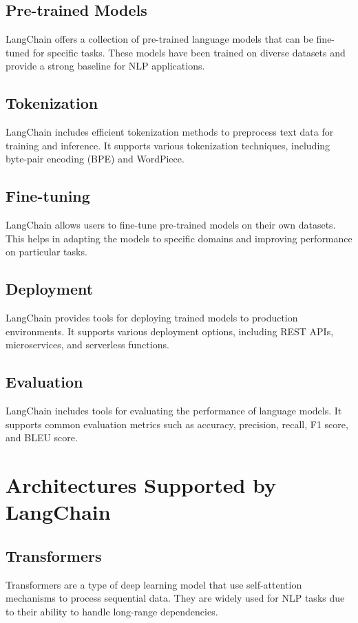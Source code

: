 \subsection{Pre-trained Models}
LangChain offers a collection of pre-trained language models that can be fine-tuned for specific tasks. These models have been trained on diverse datasets and provide a strong baseline for NLP applications.

\subsection{Tokenization}
LangChain includes efficient tokenization methods to preprocess text data for training and inference. It supports various tokenization techniques, including byte-pair encoding (BPE) and WordPiece.

\subsection{Fine-tuning}
LangChain allows users to fine-tune pre-trained models on their own datasets. This helps in adapting the models to specific domains and improving performance on particular tasks.

\subsection{Deployment}
LangChain provides tools for deploying trained models to production environments. It supports various deployment options, including REST APIs, microservices, and serverless functions.

\subsection{Evaluation}
LangChain includes tools for evaluating the performance of language models. It supports common evaluation metrics such as accuracy, precision, recall, F1 score, and BLEU score.

\section{Architectures Supported by LangChain}

\subsection{Transformers}
Transformers are a type of deep learning model that use self-attention mechanisms to process sequential data. They are widely used for NLP tasks due to their ability to handle long-range dependencies.

